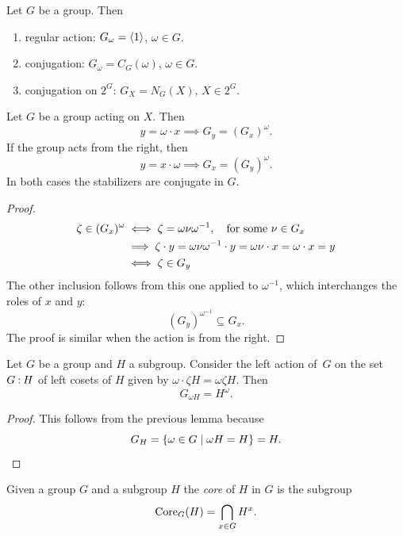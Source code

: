 \begin{rem}\label{basic-stabilizers}
    Let $G$ be a group. Then
    \begin{enumerate}[\upshape i)]
        \item \textrm{\upshape regular action:} $G_\omega=\langle1\rangle$, $\omega\in G$.
        \item \textrm{\upshape conjugation:} $G_\omega=C_G(\omega)$, $\omega\in G$.
        \item \textrm{\upshape conjugation on $2^G$:} $G_X=N_G(X)$, $X\in 2^G$.
    \end{enumerate}
\end{rem}

\begin{lem}\label{stabilizer-conjugate}
    Let\/ $G$ be a group acting on $X$. Then
    $$
        y = \omega\cdot x\implies G_y = (G_x)^\omega.
    $$
    If the group acts from the right, then
    $$
        y = x\cdot\omega\implies G_x = (G_y)^\omega.
    $$
    In both cases the stabilizers are conjugate in\/ $G$.
\end{lem}

\begin{proof}
\begin{align*}
    \zeta\in(G_x)^\omega &\iff \zeta=\omega\nu\omega^{-1},\quad\textrm{\upshape for some }\nu\in G_x\\
        &\implies \zeta\cdot y=\omega\nu\omega^{-1}\cdot y=\omega\nu\cdot x
            =\omega\cdot x=y\\
        &\iff \zeta\in G_y
\end{align*}
The other inclusion follows from this one applied to $\omega^{-1}$, which interchanges the roles of $x$ and $y$:
$$
    (G_y)^{\omega^{-1}} \subseteq G_x.
$$
The proof is similar when the action is from the right.  \end{proof}


\begin{lem}\label{core}
    Let\/ $G$ be a group and $H$ a subgroup. Consider the left action of\/~$G$ on the set\/ $G\mathbin:H$ of left cosets of\/ $H$ given by $\omega\cdot \zeta H = \omega\zeta H$. Then
    $$
        G_{\omega H}= H^\omega.
    $$
\end{lem}

\begin{proof} This follows from the previous lemma because
$$
    G_H=\{\omega\in G\mid \omega H=H\} = H.
$$
\end{proof}

\begin{defn}\label{Core_G}
    Given a group\/ $G$ and a subgroup\/ $H$ the \textsl{core} of\/ $H$ in $G$ is the subgroup
    $$
        {\rm Core}_G(H) = \bigcap_{x\in G}H^x.
    $$
\end{defn}

